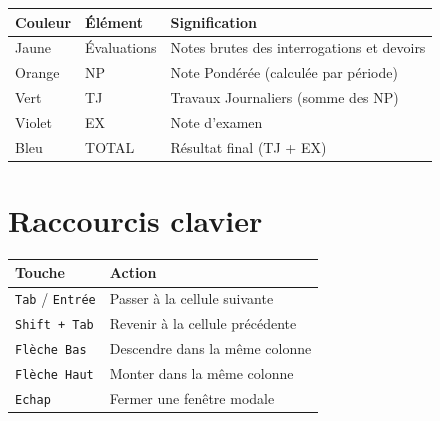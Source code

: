 \begin{tabularx}{\textwidth}{p{1.5cm}lX}
\toprule
\textbf{Couleur} & \textbf{\'El\'ement} & \textbf{Signification} \\
\midrule
Jaune & \'Evaluations & Notes brutes des interrogations et devoirs \\
Orange & NP & Note Pond\'er\'ee (calcul\'ee par p\'eriode) \\
Vert & TJ & Travaux Journaliers (somme des NP) \\
Violet & EX & Note d'examen \\
Bleu & TOTAL & R\'esultat final (TJ + EX) \\
\bottomrule
\end{tabularx}

\section{Raccourcis clavier}

\begin{tabularx}{\textwidth}{lX}
\toprule
\textbf{Touche} & \textbf{Action} \\
\midrule
\texttt{Tab} / \texttt{Entr\'ee} & Passer \`a la cellule suivante \\
\texttt{Shift + Tab} & Revenir \`a la cellule pr\'ec\'edente \\
\texttt{Fl\`eche Bas} & Descendre dans la m\^eme colonne \\
\texttt{Fl\`eche Haut} & Monter dans la m\^eme colonne \\
\texttt{Echap} & Fermer une fen\^etre modale \\
\bottomrule
\end{tabularx}

\vspace{2cm}
\begin{center}
\end{center}
